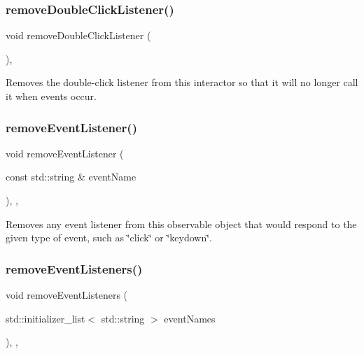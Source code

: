 \subsubsection{\texorpdfstring{remove\+Double\+Click\+Listener()}{removeDoubleClickListener()}}
{\footnotesize\ttfamily void remove\+Double\+Click\+Listener (\begin{DoxyParamCaption}{ }\end{DoxyParamCaption})\hspace{0.3cm}{\ttfamily [virtual]}, {\ttfamily [inherited]}}



Removes the double-\/click listener from this interactor so that it will no longer call it when events occur. 

\mbox{\label{classGObservable_acbcf1ed3a851ad8a3c17ef38d86b481d}} 
\subsubsection{\texorpdfstring{remove\+Event\+Listener()}{removeEventListener()}}
{\footnotesize\ttfamily void remove\+Event\+Listener (\begin{DoxyParamCaption}\item[{const std\+::string \&}]{event\+Name }\end{DoxyParamCaption})\hspace{0.3cm}{\ttfamily [protected]}, {\ttfamily [virtual]}, {\ttfamily [inherited]}}



Removes any event listener from this observable object that would respond to the given type of event, such as \char`\"{}click\char`\"{} or \char`\"{}keydown\char`\"{}. 

\mbox{\label{classGObservable_af51cc35c29a1bd1908609d432decdbb6}} 
\subsubsection{\texorpdfstring{remove\+Event\+Listeners()}{removeEventListeners()}}
{\footnotesize\ttfamily void remove\+Event\+Listeners (\begin{DoxyParamCaption}\item[{std\+::initializer\+\_\+list$<$ std\+::string $>$}]{event\+Names }\end{DoxyParamCaption})\hspace{0.3cm}{\ttfamily [protected]}, {\ttfamily [virtual]}, {\ttfamily [inherited]}}



